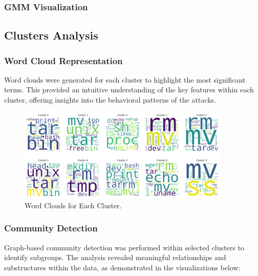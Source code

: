 
        \subsubsection{GMM Visualization \\}


    \subsection{Clusters Analysis}

        \subsubsection{Word Cloud Representation \\}

            Word clouds were generated for each cluster to highlight the most significant terms. This provided an intuitive understanding of the key features within each cluster, offering insights into the behavioral patterns of the attacks.

            \begin{figure}[H]
                \centering
                \includegraphics[width=0.9\textwidth]{../figures/plots/section3/circular_wordclouds.png}
                \caption{Word Clouds for Each Cluster.}
                \label{fig:word_clouds}
            \end{figure}

        \subsubsection{Community Detection \\}

            Graph-based community detection was performed within selected clusters to identify subgroups. The analysis revealed meaningful relationships and substructures within the data, as demonstrated in the visualizations below:
            
